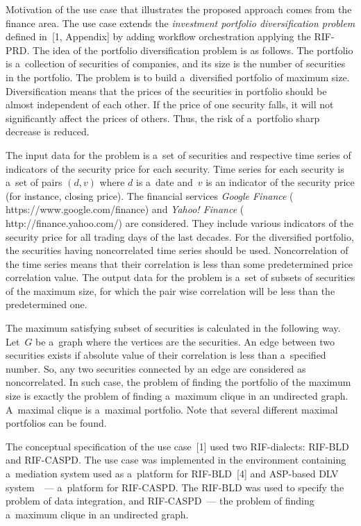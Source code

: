 \begin{multicols}{2}
{  \noindent
  Motivation of the use case that illustrates the proposed approach comes from the
finance area. The use case extends the \textit{investment portfolio diversification
problem} defined in~[1, Appendix] by adding workflow orchestration applying the
RIF-PRD. The idea of the portfolio diversification problem is
as follows. The portfolio is a~collection of securities of companies, and its size is the
number of securities in the portfolio. The problem is to build a~diversified portfolio of
maximum size. Diversification means that the prices of the securities in portfolio
should be almost independent of each other. If the price of one security falls, it will
not significantly affect the prices of others. Thus, the risk of a~portfolio sharp decrease
is reduced.

  The input data for the problem is a~set of securities and respective time series of
indicators of the security price for each security. Time series for each security is a~set
of pairs $(d, v)$ where $d$ is a~date and~$v$ is an indicator of the security price (for
instance, closing price). The financial services \textit{Google Finance} ({\sf
https://www.google.com/finance}) and \textit{Yahoo! Finance} ({\sf
http://finance.yahoo.com/}) are considered. They include various indicators of the
security price for all trading days of the last decades. For the diversified portfolio, the
securities having noncorrelated time series should be used. Noncorrelation of the
time series means that their correlation is less than some predetermined price
correlation value. The output data for the problem is a~set of subsets of securities of
the maximum size, for which the pair wise correlation will be less than the
predetermined one.

  The maximum satisfying subset of securities is calculated in the following way.
Let~$G$ be a~graph where the vertices are the securities. An edge between two
securities exists if absolute value of their correlation is less than a~specified number.
So, any two securities connected by an edge are considered as noncorrelated. In such
case, the problem of finding the portfolio of the maximum size is exactly the problem
of finding a~maximum clique in an undirected graph. A~maximal clique is a~maximal
portfolio. Note that several different maximal portfolios can be found.

  The conceptual specification of the use case~[1] used two RIF-dialects: RIF-BLD
and RIF-CASPD. The use case was implemented in the environment containing a~mediation system used as a~platform for RIF-BLD~[4] and ASP-based DLV
system~\cite{6-kal}~--- a~platform for RIF-CASPD. The RIF-BLD was used to
specify the problem of data integration, and RIF-CASPD~--- the problem of finding
a~maximum clique in an undirected graph.

}
\end{multicols}
